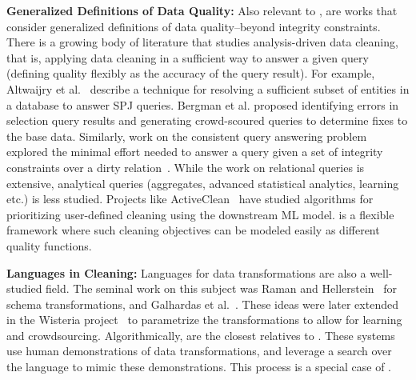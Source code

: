 \vspace{0.25em} \noindent \textbf{Generalized Definitions of Data Quality: } Also relevant to \sys, are works that consider generalized definitions of data quality--beyond integrity constraints.
There is a growing body of literature that studies analysis-driven data cleaning, that is, applying data cleaning in a sufficient way to answer a given query (defining quality flexibly as the accuracy of the query result).
For example, Altwaijry et al.~\cite{altwaijry2015query} describe a technique for resolving a sufficient subset of entities in a database to answer SPJ queries.
Bergman et al. \cite{DBLP:conf/sigmod/BergmanMNT15} proposed identifying errors in selection query results and generating crowd-scoured queries to determine fixes to the base data.
Similarly, work on the consistent query answering problem explored the minimal effort needed to answer a query given a set of integrity constraints over a dirty relation~\cite{DBLP:series/synthesis/2011Bertossi}.
While the work on relational queries is extensive, analytical queries (aggregates, advanced statistical analytics, learning etc.) is less studied.
Projects like ActiveClean~\cite{DBLP:journals/pvldb/KrishnanWWFG16} have studied algorithms for prioritizing user-defined cleaning using the downstream ML model.
\sys is a flexible framework where such cleaning objectives can be modeled easily as different quality functions.

\vspace{0.25em} \noindent \textbf{Languages in Cleaning: } Languages for data transformations are also a well-studied field. The seminal work on this subject was Raman and Hellerstein~\cite{raman2001potter} for schema transformations, and Galhardas et al.~\cite{DBLP:conf/vldb/GalhardasFSSS01}. These ideas were later extended in the Wisteria project~\cite{DBLP:journals/pvldb/HaasKWF015} to parametrize the transformations to allow for learning and crowdsourcing. Algorithmically, \cite{wrangler, jin2017foofah} are the closest relatives to \sys. These systems use human demonstrations of data transformations, and leverage a search over the language to mimic these demonstrations. This process is a special case of \sys.



